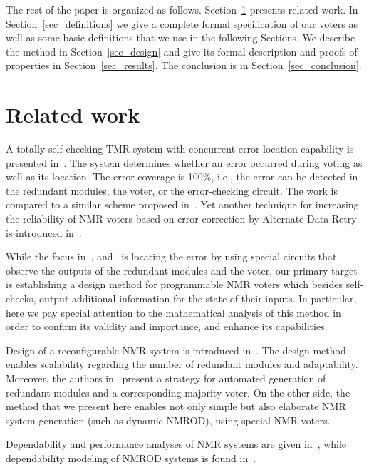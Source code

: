\documentclass[technote, a4paper, onecolumn]{IEEEtran}  \newcommand{\avtor}{Aleksandar Simevski}
\begin{document}
The rest of the paper is organized as follows. Section~\ref{sec_related} presents related work. In Section~\ref{sec_definitions} we give a complete formal specification of our voters as well as some basic definitions that we use in the following Sections. We describe the method in Section~\ref{sec_design} and give its formal description and proofs of  properties in Section~\ref{sec_results}. The conclusion is in Section~\ref{sec_conclusion}.

\section{Related work}\label{sec_related}

A totally self-checking TMR system with concurrent error location capability is presented in~\cite{Jiang1999}. The system determines whether an error occurred during voting as well as its location. The error coverage is 100\%, i.e., the error can be detected in the redundant modules, the voter, or the error-checking circuit. The work is compared to a similar scheme proposed in~\cite{Gaitanis1988}. Yet another technique for increasing the reliability of NMR voters based on error correction by Alternate-Data Retry is introduced in~\cite{Takaesu2004}.

While the focus in~\cite{Jiang1999}, \cite{Gaitanis1988} and~\cite{Takaesu2004} is locating the error by using special circuits that observe the outputs of the redundant modules and the voter, our primary target is establishing a design method for programmable NMR voters which besides self-checks, output additional information for the state of their inputs. In particular, here we pay special attention to the mathematical analysis of this method in order to confirm its validity and importance, and enhance its capabilities.

Design of a reconfigurable NMR system is introduced in~\cite{Lo1990}. The design method enables scalability regarding the number of redundant modules  and adaptability. Moreover, the authors in~\cite{Ruiz2008} present a strategy for automated generation of redundant modules and a corresponding majority voter. On the other side, the method that we present here enables not only simple but also elaborate NMR system generation (such as dynamic NMROD), using special NMR voters.

Dependability and performance analyses of NMR systems are given in~\cite{Srihari1982, Koren1979, Beaudry1978}, while dependability modeling of NMROD systems is found in~\cite{Al-Hashimi2001, Lombardi2001}.
\end{document}
